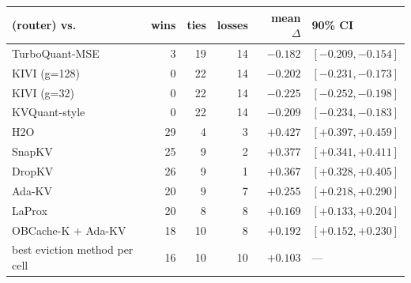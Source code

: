 \begin{tabular}{@{}lrrrrl@{}}
\toprule
\sieve{} (router) vs. & wins & ties & losses & mean $\Delta$ & 90\% CI \\
\midrule
TurboQuant-MSE & 3 & 19 & 14 & $-0.182$ & $[-0.209, -0.154]$ \\
KIVI (g=128) & 0 & 22 & 14 & $-0.202$ & $[-0.231, -0.173]$ \\
KIVI (g=32) & 0 & 22 & 14 & $-0.225$ & $[-0.252, -0.198]$ \\
KVQuant-style & 0 & 22 & 14 & $-0.209$ & $[-0.234, -0.183]$ \\
H2O & 29 & 4 & 3 & $+0.427$ & $[+0.397, +0.459]$ \\
SnapKV & 25 & 9 & 2 & $+0.377$ & $[+0.341, +0.411]$ \\
DropKV & 26 & 9 & 1 & $+0.367$ & $[+0.328, +0.405]$ \\
Ada-KV & 20 & 9 & 7 & $+0.255$ & $[+0.218, +0.290]$ \\
LaProx & 20 & 8 & 8 & $+0.169$ & $[+0.133, +0.204]$ \\
OBCache-K + Ada-KV & 18 & 10 & 8 & $+0.192$ & $[+0.152, +0.230]$ \\
best eviction method per cell & 16 & 10 & 10 & $+0.103$ & --- \\
\bottomrule
\end{tabular}
